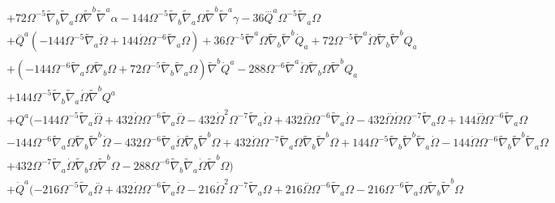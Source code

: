 \documentclass[10pt,letterpaper]{article}
\numberwithin{equation}{section}
\begin{document}
\begin{eqnarray}
&& + 72 \Omega^{-5} \tilde{\nabla}_{b}\tilde{\nabla}_{a}\Omega \tilde{\nabla}^{b}\tilde{\nabla}^{a}\alpha - 144 \Omega^{-5} \tilde{\nabla}_{b}\tilde{\nabla}_{a}\Omega \tilde{\nabla}^{b}\tilde{\nabla}^{a}\gamma -36 \overset{...}{Q}^{a} \Omega^{-5} \tilde{\nabla}_{a}\Omega \nonumber \\ 
&& + \overset{..}{Q}^{a} (-144 \Omega^{-5} \tilde{\nabla}_{a}\dot{\Omega} + 144 \dot{\Omega} \Omega^{-6} \tilde{\nabla}_{a}\Omega) + 36 \Omega^{-5} \tilde{\nabla}^{a}\Omega \tilde{\nabla}_{b}\tilde{\nabla}^{b}\dot{Q}_{a} + 72 \Omega^{-5} \tilde{\nabla}^{a}\dot{\Omega} \tilde{\nabla}_{b}\tilde{\nabla}^{b}Q_{a} \nonumber \\ 
&& + (-144 \Omega^{-6} \tilde{\nabla}_{a}\Omega \tilde{\nabla}_{b}\Omega + 72 \Omega^{-5} \tilde{\nabla}_{b}\tilde{\nabla}_{a}\Omega) \tilde{\nabla}^{b}\dot{Q}^{a} - 288 \Omega^{-6} \tilde{\nabla}^{a}\dot{\Omega} \tilde{\nabla}_{b}\Omega \tilde{\nabla}^{b}Q_{a} \nonumber \\ 
&& + 144 \Omega^{-5} \tilde{\nabla}_{b}\tilde{\nabla}_{a}\dot{\Omega} \tilde{\nabla}^{b}Q^{a} \nonumber \\ 
&& + Q^{a} (-144 \Omega^{-5} \tilde{\nabla}_{a}\overset{...}{\Omega} + 432 \dot{\Omega} \Omega^{-6} \tilde{\nabla}_{a}\overset{..}{\Omega} - 432 \dot{\Omega}^2 \Omega^{-7} \tilde{\nabla}_{a}\dot{\Omega} + 432 \overset{..}{\Omega} \Omega^{-6} \tilde{\nabla}_{a}\dot{\Omega} - 432 \overset{..}{\Omega} \dot{\Omega} \Omega^{-7} \tilde{\nabla}_{a}\Omega + 144 \overset{...}{\Omega} \Omega^{-6} \tilde{\nabla}_{a}\Omega \nonumber\\
&& - 144 \Omega^{-6} \tilde{\nabla}_{a}\Omega \tilde{\nabla}_{b}\tilde{\nabla}^{b}\dot{\Omega} - 432 \Omega^{-6} \tilde{\nabla}_{a}\dot{\Omega} \tilde{\nabla}_{b}\tilde{\nabla}^{b}\Omega + 432 \dot{\Omega} \Omega^{-7} \tilde{\nabla}_{a}\Omega \tilde{\nabla}_{b}\tilde{\nabla}^{b}\Omega + 144 \Omega^{-5} \tilde{\nabla}_{b}\tilde{\nabla}^{b}\tilde{\nabla}_{a}\dot{\Omega} - 144 \dot{\Omega} \Omega^{-6} \tilde{\nabla}_{b}\tilde{\nabla}^{b}\tilde{\nabla}_{a}\Omega \nonumber\\
&& + 432 \Omega^{-7} \tilde{\nabla}_{a}\dot{\Omega} \tilde{\nabla}_{b}\Omega \tilde{\nabla}^{b}\Omega - 288 \Omega^{-6} \tilde{\nabla}_{b}\tilde{\nabla}_{a}\dot{\Omega} \tilde{\nabla}^{b}\Omega) \nonumber \\ 
&& + \dot{Q}^{a} (-216 \Omega^{-5} \tilde{\nabla}_{a}\overset{..}{\Omega} + 432 \dot{\Omega} \Omega^{-6} \tilde{\nabla}_{a}\dot{\Omega} - 216 \dot{\Omega}^2 \Omega^{-7} \tilde{\nabla}_{a}\Omega + 216 \overset{..}{\Omega} \Omega^{-6} \tilde{\nabla}_{a}\Omega - 216 \Omega^{-6} \tilde{\nabla}_{a}\Omega \tilde{\nabla}_{b}\tilde{\nabla}^{b}\Omega \nonumber\\

\end{eqnarray}
\end{document}
